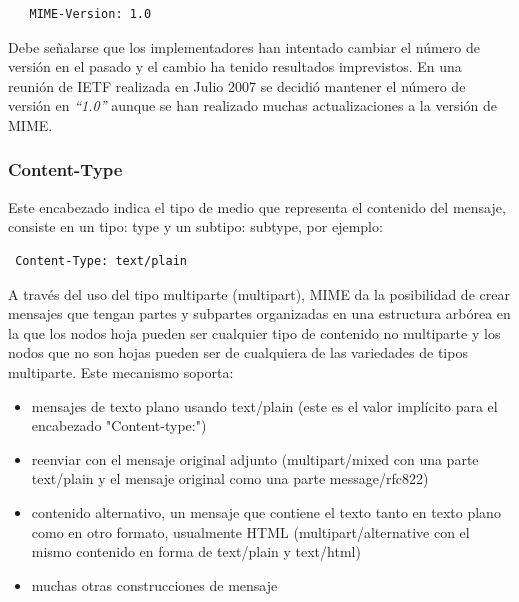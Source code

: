 \documentclass[a4paper]{report}
\begin{document}
\begin{verbatim}
   MIME-Version: 1.0
\end{verbatim}

Debe señalarse que los implementadores han intentado cambiar el número de
versión en el pasado y el cambio ha tenido resultados imprevistos. En una
reunión de IETF realizada en Julio 2007 se decidió mantener el número de versión
en \emph{``1.0''} aunque se han realizado muchas actualizaciones a la versión de MIME.

\subsubsection*{Content-Type}
Este encabezado indica el tipo de medio que representa el contenido del mensaje,
consiste en un tipo: type y un subtipo: subtype, por ejemplo:
\begin{verbatim}
 Content-Type: text/plain
\end{verbatim}
A través del uso del tipo multiparte (multipart), MIME da la posibilidad de
crear mensajes que tengan partes y subpartes organizadas en una estructura
arbórea en la que los nodos hoja pueden ser cualquier tipo de contenido no
multiparte y los nodos que no son hojas pueden ser de cualquiera de las
variedades de tipos multiparte. Este mecanismo soporta:
\begin{itemize}
\item{mensajes de texto plano usando text/plain (este es el valor implícito para
el encabezado "Content-type:")}
\item{reenviar con el mensaje original adjunto (multipart/mixed con una parte
text/plain y el mensaje original como una parte message/rfc822)}
\item{contenido alternativo, un mensaje que contiene el texto tanto en texto
plano como en otro formato, usualmente HTML (multipart/alternative con el mismo
contenido en forma de text/plain y text/html)}
\item{muchas otras construcciones de mensaje}
\end{itemize}
\end{document}
